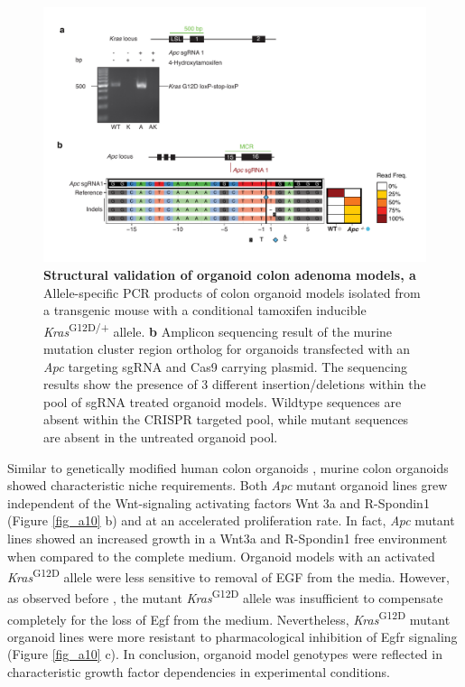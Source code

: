\begin{flushleft}
\begin{figure}[h]
\centering
\includegraphics[width=\textwidth,
                height=\textheight,
                keepaspectratio]{figures/adenomaprofiling/pdf/fig_1_1.pdf}
\caption[Structural validation of organoid colon adenoma models]{\textbf{Structural validation of organoid colon adenoma models, a} Allele-specific PCR products of colon organoid models isolated from a transgenic mouse with a conditional tamoxifen inducible \textit{Kras}\textsuperscript{G12D/+} allele.
\textbf{b} Amplicon sequencing result of the murine mutation cluster region ortholog for organoids transfected with an \textit{Apc} targeting sgRNA and Cas9 carrying plasmid. The sequencing results show the presence of 3 different insertion/deletions within the pool of sgRNA treated organoid models. Wildtype sequences are absent within the CRISPR targeted pool, while mutant sequences are absent in the untreated organoid pool.}
\label{fig_a11}
\end{figure}
\bigbreak

Similar to genetically modified human colon organoids \parencite{drostSequentialCancerMutations2015, matanoModelingColorectalCancer2015a}, murine colon organoids showed characteristic niche requirements. Both \textit{Apc} mutant organoid lines grew independent of the Wnt-signaling activating factors Wnt 3a and R-Spondin1 (Figure \ref{fig_a10} b) and at an accelerated proliferation rate. In fact, \textit{Apc} mutant lines showed an increased growth in a Wnt3a and R-Spondin1 free environment when compared to the complete medium. Organoid models with an activated \textit{Kras}\textsuperscript{G12D} allele were less sensitive to removal of EGF from the media. However, as observed before \parencite{drostSequentialCancerMutations2015}, the mutant \textit{Kras}\textsuperscript{G12D} allele was insufficient to compensate completely for the loss of Egf from the medium. Nevertheless, \textit{Kras}\textsuperscript{G12D} mutant organoid lines were more resistant to pharmacological inhibition of Egfr signaling (Figure \ref{fig_a10} c). In conclusion, organoid model genotypes were reflected in characteristic growth factor dependencies in experimental conditions.


\end{flushleft}
